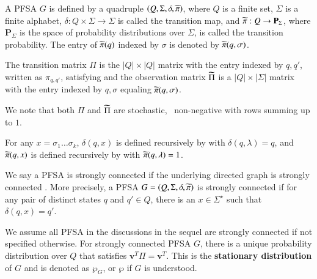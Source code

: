 \begin{defn}
\label{defn:PFSA}
A PFSA $G$ is defined by a quadruple $\left( Q, \Sigma, \delta, \widetilde{\pi} \right)$, where $Q$ is a finite set, $\Sigma$ is a finite alphabet, $\delta: Q\times\Sigma \rightarrow \Sigma$ is called the transition map, and $\widetilde{\pi}: Q \rightarrow \mathbf{P}_\Sigma$, where $\mathbf{P}_\Sigma$ is the space of probability distributions over $\Sigma$, is called the transition probability. The entry of $\widetilde{\pi}(q)$ indexed by $\sigma$ is denoted by $\widetilde{\pi}(q,\sigma)$. 
\end{defn}
\begin{defn}
The transition matrix $\Pi$ is the $|Q|\times|Q|$ matrix with the entry indexed by $q, q'$, written as $\pi_{q, q'}$, satisfying
and the observation matrix $\widetilde{\Pi}$ is a $|Q|\times|\Sigma|$ matrix with the entry indexed by $q, \sigma$ equaling $\widetilde{\pi}(q, \sigma)$.
\end{defn}
We note that both $\Pi$ and $\widetilde{\Pi}$ are stochastic, \ie~non-negative with rows summing up to $1$. 
%
\begin{defn}
For any $x = \sigma_1\dots\sigma_k$, $\delta(q, x)$ is defined recursively by 
with $\delta(q, \lambda) = q$, and $\widetilde{\pi}(q, x)$ is defined recursively by
with $\widetilde{\pi}(q, \lambda) = 1$. 
\end{defn}
%
\begin{defn}
\label{defn:StrongConn}
We say a PFSA is strongly connected if the underlying directed graph is strongly connected \cite{bondy2008graph}. More precisely, a PFSA $G = \left( Q, \Sigma, \delta, \widetilde{\pi} \right)$ is strongly connected if for any pair of distinct states $q$ and $q'\in{Q}$, there is an $x\in\Sigma^{\star}$ such that $\delta(q, x) = q'$.
\end{defn}
We assume all PFSA in the discussions in the sequel are strongly connected if not specified otherwise. For strongly connected PFSA $G$, there is a unique probability distribution over $Q$ that satisfies $\mathbf{v}^{T}\Pi = \mathbf{v}^{T}$. This is  the \textbf{stationary distribution} \cite{vidyasagar2014hidden,kai1967markov_stdis} of $G$ and is denoted as $\wp_G$, or $\wp$ if $G$ is understood. 

